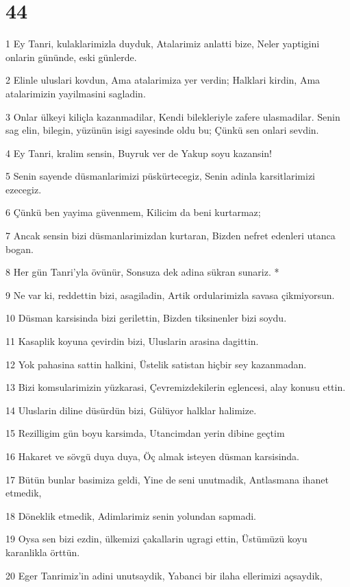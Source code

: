 \chapter{44}

\par 1 Ey Tanri, kulaklarimizla duyduk, Atalarimiz anlatti bize, Neler yaptigini onlarin gününde, eski günlerde.
\par 2 Elinle uluslari kovdun, Ama atalarimiza yer verdin; Halklari kirdin, Ama atalarimizin yayilmasini sagladin.
\par 3 Onlar ülkeyi kiliçla kazanmadilar, Kendi bilekleriyle zafere ulasmadilar. Senin sag elin, bilegin, yüzünün isigi sayesinde oldu bu; Çünkü sen onlari sevdin.
\par 4 Ey Tanri, kralim sensin, Buyruk ver de Yakup soyu kazansin!
\par 5 Senin sayende düsmanlarimizi püskürtecegiz, Senin adinla karsitlarimizi ezecegiz.
\par 6 Çünkü ben yayima güvenmem, Kilicim da beni kurtarmaz;
\par 7 Ancak sensin bizi düsmanlarimizdan kurtaran, Bizden nefret edenleri utanca bogan.
\par 8 Her gün Tanri'yla övünür, Sonsuza dek adina sükran sunariz. *
\par 9 Ne var ki, reddettin bizi, asagiladin, Artik ordularimizla savasa çikmiyorsun.
\par 10 Düsman karsisinda bizi gerilettin, Bizden tiksinenler bizi soydu.
\par 11 Kasaplik koyuna çevirdin bizi, Uluslarin arasina dagittin.
\par 12 Yok pahasina sattin halkini, Üstelik satistan hiçbir sey kazanmadan.
\par 13 Bizi komsularimizin yüzkarasi, Çevremizdekilerin eglencesi, alay konusu ettin.
\par 14 Uluslarin diline düsürdün bizi, Gülüyor halklar halimize.
\par 15 Rezilligim gün boyu karsimda, Utancimdan yerin dibine geçtim
\par 16 Hakaret ve sövgü duya duya, Öç almak isteyen düsman karsisinda.
\par 17 Bütün bunlar basimiza geldi, Yine de seni unutmadik, Antlasmana ihanet etmedik,
\par 18 Döneklik etmedik, Adimlarimiz senin yolundan sapmadi.
\par 19 Oysa sen bizi ezdin, ülkemizi çakallarin ugragi ettin, Üstümüzü koyu karanlikla örttün.
\par 20 Eger Tanrimiz'in adini unutsaydik, Yabanci bir ilaha ellerimizi açsaydik,
